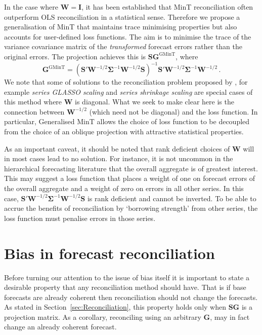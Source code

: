 \documentclass[12pt]{article}
\theoremstyle{definition}
\begin{document}
{In the case where $\bm{W}=\bm{I}$, it has been established that MinT reconciliation often outperform OLS reconciliation in a statistical sense.  Therefore we propose a generalisation of MinT that maintains trace minimising properties but also accounts for user-defined loss functions.  The aim is to minimise the trace of the variance covariance matrix of the \textit{transformed} forecast errors rather than the original errors. The projection achieves this is $\bm{S}\bm{G}^{\text{GMinT}}$, where
\begin{equation*}
\bm{G}^{\text{GMinT}}=\left(\bm{S}'{\bm W}^{-1/2}\bm{\Sigma}^{-1}{\bm W}^{-1/2}\bm{S}\right)^{-1}\bm{S}'{\bm W}^{-1/2}\bm{\Sigma}^{-1}{\bm W}^{-1/2}\,.
\end{equation*} 
We note that some of solutions to the reconciliation problem proposed by \cite{NysEtAl2019}, for example \textit{series GLASSO scaling} and \textit{series shrinkage scaling} are special cases of this method where $\bm{W}$ is diagonal.  What we seek to make clear here is the connection between $\bm{W}^{-1/2}$ (which need not be diagonal) and the loss function. In particular, Generalised MinT allows the choice of loss function to be decoupled from the choice of an oblique projection with attractive statistical properties.  

As an important caveat, it should be noted that rank deficient choices of $\bm{W}$ will in most cases lead to no solution.  For instance, it is not uncommon in the hierarchical forecasting literature that the overall aggregate is of greatest interest. This may suggest a loss function that places a weight of one on forecast errors of the overall aggregate and a weight of zero on errors in all other series.  In this case, $\bm{S}'{\bm W}^{-1/2}\bm{\Sigma}^{-1}{\bm W}^{-1/2}\bm{S}$ is rank deficient and cannot be inverted.  To be able to accrue the benefits of reconciliation by `borrowing strength' from other series, the loss function must penalise errors in those series.

}
\section{Bias in forecast reconciliation}\label{sec:BiasInRecon}

Before turning our attention to the issue of bias itself it is important to state a desirable property that any reconciliation method should have. That is if base forecasts are already coherent then reconciliation should not change the forecasts. As stated in Section~\ref{sec:Reconciliation}, this property holds only when $\bm{S}\bm{G}$ is a projection matrix. As a corollary, reconciling using an arbitrary $\bm{G}$, may in fact change an already coherent forecast.
\end{document}
